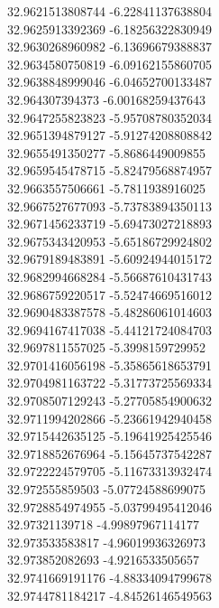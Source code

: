 {32.9621513808744	-6.22841137638804\\
32.9625913392369	-6.18256322830949\\
32.9630268960982	-6.13696679388837\\
32.9634580750819	-6.09162155860705\\
32.9638848999046	-6.04652700133487\\
32.964307394373	-6.00168259437643\\
32.9647255823823	-5.95708780352034\\
32.9651394879127	-5.91274208808842\\
32.9655491350277	-5.8686449009855\\
32.9659545478715	-5.82479568874957\\
32.9663557506661	-5.7811938916025\\
32.9667527677093	-5.73783894350113\\
32.9671456233719	-5.69473027218893\\
32.9675343420953	-5.65186729924802\\
32.9679189483891	-5.60924944015172\\
32.9682994668284	-5.56687610431743\\
32.9686759220517	-5.52474669516012\\
32.9690483387578	-5.48286061014603\\
32.9694167417038	-5.44121724084703\\
32.9697811557025	-5.3998159729952\\
32.9701416056198	-5.35865618653791\\
32.9704981163722	-5.31773725569334\\
32.9708507129243	-5.27705854900632\\
32.9711994202866	-5.23661942940458\\
32.9715442635125	-5.19641925425546\\
32.9718852676964	-5.15645737542287\\
32.9722224579705	-5.11673313932474\\
32.972555859503	-5.07724588699075\\
32.9728854974955	-5.03799495412046\\
32.97321139718	-4.99897967114177\\
32.973533583817	-4.96019936326973\\
32.973852082693	-4.9216533505657\\
32.9741669191176	-4.88334094799678\\
32.9744781184217	-4.84526146549563\\
}
